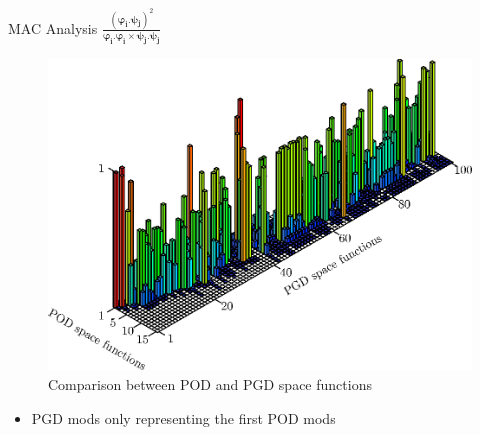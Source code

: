 \documentclass[12pt]{beamer}
\begin{document}
\begin{frame}{MAC Analysis
	$\frac{\left(\boldsymbol{\varphi_i.\psi_j}\right)^2}{\boldsymbol{\varphi_i.\varphi_i \times \psi_j.\psi_j}}$} 
	\vspace{-0.75cm}
	\begin{figure}
	\includegraphics[width=0.7\linewidth]{MAC-POD-PGD.eps}
	\vspace{-0.4cm}
	\caption{Comparison between POD and PGD space functions}
	\end{figure}
	\vspace{-0.75cm}
	\begin{itemize}
		\item PGD mods only representing the first POD mods
	\end{itemize}
\end{frame}
\end{document}
